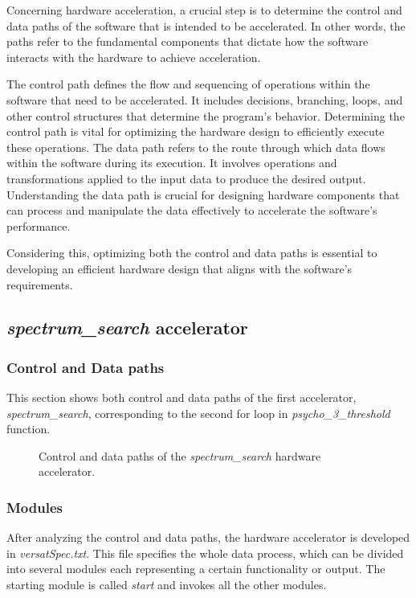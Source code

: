 \vspace{0.5cm}

Concerning hardware acceleration, a crucial step is to determine the control and data paths of the software that is intended to be accelerated. In other words, the paths refer to the fundamental components that dictate how the software interacts with the hardware to achieve acceleration.

The control path defines the flow and sequencing of operations within the software that need to be accelerated. It includes decisions, branching, loops, and other control structures that determine the program's behavior. Determining the control path is vital for optimizing the hardware design to efficiently execute these operations.
The data path refers to the route through which data flows within the software during its execution. It involves operations and transformations applied to the input data to produce the desired output. Understanding the data path is crucial for designing hardware components that can process and manipulate the data effectively to accelerate the software's performance.

Considering this, optimizing both the control and data paths is essential to developing an efficient hardware design that aligns with the software's requirements.

\subsection{\textit{spectrum\_search} accelerator}

\subsubsection{Control and Data paths}
This section shows both control and data paths of the first accelerator, \textit{spectrum\_search}, corresponding to the second for loop in \textit{psycho\_3\_threshold} function.

\begin{figure}[H]
\centerline{}
\caption{Control and data paths of the \textit{spectrum\_search} hardware accelerator.}
\label{data1}
\end{figure}

\subsubsection{Modules}
After analyzing the control and data paths, the hardware accelerator is developed in \textit{versatSpec.txt}. This file specifies the whole data process, which can be divided into several modules each representing a certain functionality or output. The starting module is called \textit{start} and invokes all the other modules.

